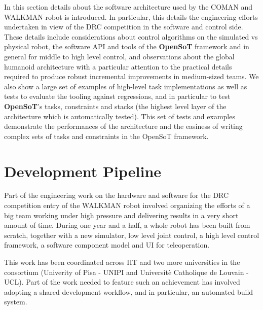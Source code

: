 

In this section details about the software architecture used by the COMAN and WALKMAN robot is introduced. In particular, this details the engineering efforts undertaken in view of the DRC competition in the software and control side. 
These details include considerations about control algorithms on the simulated vs physical robot, the software API and tools of the \textbf{OpenSoT} framework and in general for middle to high level control, and observations about the global humanoid architecture with a particular attention to the practical details required to produce robust incremental improvements in medium-sized teams. We also show a large set of examples of high-level task implementations as well as tests to evaluate the tooling against regressions, and in particular to test \textbf{OpenSoT}'s tasks, constraints and stacks (the highest level layer of the architecture which is automatically tested).
This set of tests and examples demonstrate the performances of the architecture and the easiness of writing complex sets of tasks and constraints in the OpenSoT framework.

\section{Development Pipeline}
Part of the engineering work on the hardware and software for the DRC competition entry of the WALKMAN robot involved organizing the efforts of a big team working under high pressure and delivering results in a very short amount of time.
During one year and a half, a whole robot has been built from scratch, together with a new simulator, low level joint control, a high level control framework, a software component model and UI for teleoperation.

This work has been coordinated across IIT and two more universities in the consortium (Univerity of Pisa - UNIPI and Universit\`e Catholique de Louvain - UCL). Part of the work needed to feature such an achievement has involved adopting a shared development workflow, and in particular, an automated build system.

